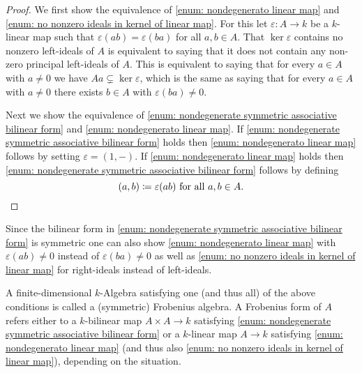 \begin{proof}
 We first show the equivalence of \ref{enum: nondegenerato linear map} and \ref{enum: no nonzero ideals in kernel of linear map}. For this let $\varepsilon \colon A \to k$ be a $k$-linear map such that $\varepsilon(ab) = \varepsilon(ba)$ for all $a,b \in A$. That $\ker \varepsilon$ contains no nonzero left-ideals of $A$ is equivalent to saying that it does not contain any non-zero principal left-ideals of $A$. This is equivalent to saying that for every $a \in A$ with $a \neq 0$ we have $Aa \subsetneq \ker \varepsilon$, which is the same as saying that for every $a \in A$ with $a \neq 0$ there exists $b \in A$ with $\varepsilon(ba) \neq 0$.
 
 Next we show the equivalence of \ref{enum: nondegenerate symmetric associative bilinear form} and \ref{enum: nondegenerato linear map}. If \ref{enum: nondegenerate symmetric associative bilinear form} holds then \ref{enum: nondegenerato linear map} follows by setting $\varepsilon = (1,-)$. If \ref{enum: nondegenerato linear map} holds then \ref{enum: nondegenerate symmetric associative bilinear form} follows by defining
 \[
  (a,b) \coloneqq \varepsilon(ab) \text{ for all } a,b \in A.
  \qedhere
 \]
\end{proof}


\begin{rem}
 Since the bilinear form in \ref{enum: nondegenerate symmetric associative bilinear form} is symmetric one can also show \ref{enum: nondegenerato linear map} with $\varepsilon(ab) \neq 0$ instead of $\varepsilon(ba) \neq 0$ as well as \ref{enum: no nonzero ideals in kernel of linear map} for right-ideals instead of left-ideals.
\end{rem}


\begin{defi}
 A finite-dimensional $k$-Algebra satisfying one (and thus all) of the above conditions is called a (symmetric) Frobenius algebra. A Frobenius form of $A$ refers either to a $k$-bilinear map $A \times A \to k$ satisfying \ref{enum: nondegenerate symmetric associative bilinear form} or a $k$-linear map $A \to k$ satisfying \ref{enum: nondegenerato linear map} (and thus also \ref{enum: no nonzero ideals in kernel of linear map}), depending on the situation.
\end{defi}












































